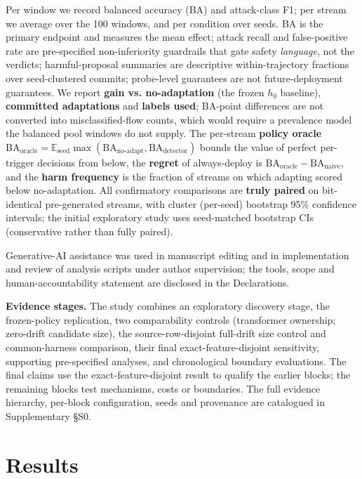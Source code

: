 \documentclass[journal]{IEEEtran}
\begin{document}
Per window we record balanced accuracy (BA) and attack-class F1; per stream we average over the 100 windows, and per condition over seeds. BA is the primary endpoint and measures the mean effect; attack recall and false-positive rate are pre-specified non-inferiority guardrails that gate safety \emph{language}, not the verdicts; harmful-proposal summaries are descriptive within-trajectory fractions over seed-clustered commits; probe-level guarantees are not future-deployment guarantees. We report \textbf{gain vs. no-adaptation} (the frozen $h_0$ baseline), \textbf{committed adaptations} and \textbf{labels used}; BA-point differences are not converted into misclassified-flow counts, which would require a prevalence model the balanced pool windows do not supply. The per-stream \textbf{policy oracle} $\mathrm{BA}_{\text{oracle}}=\mathbb{E}_{\text{seed}}\max(\mathrm{BA}_{\text{no-adapt}},\mathrm{BA}_{\text{detector}})$ bounds the value of perfect per-trigger decisions from below, the \textbf{regret} of always-deploy is $\mathrm{BA}_{\text{oracle}}-\mathrm{BA}_{\text{naive}}$, and the \textbf{harm frequency} is the fraction of streams on which adapting scored below no-adaptation. All confirmatory comparisons are \textbf{truly paired} on bit-identical pre-generated streams, with cluster (per-seed) bootstrap 95\% confidence intervals; the initial exploratory study uses seed-matched bootstrap CIs (conservative rather than fully paired).

Generative-AI assistance was used in manuscript editing and in implementation and review of analysis scripts under author supervision; the tools, scope and human-accountability statement are disclosed in the Declarations.

\textbf{Evidence stages.} The study combines an exploratory discovery stage, the frozen-policy replication, two comparability controls (transformer ownership; zero-drift candidate size), the source-row-disjoint full-drift size control and common-harness comparison, their final exact-feature-disjoint sensitivity, supporting pre-specified analyses, and chronological boundary evaluations. The final claims use the exact-feature-disjoint result to qualify the earlier blocks; the remaining blocks test mechanisms, costs or boundaries. The full evidence hierarchy, per-block configuration, seeds and provenance are catalogued in Supplementary \S S0.


\section{Results}
\end{document}
